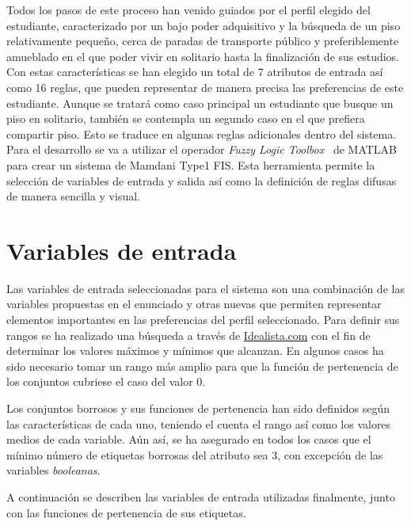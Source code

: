 \documentclass[12pt]{report} %
\begin{document}
        Todos los pasos de este proceso han venido guiados por el perfil
        elegido del estudiante, caracterizado por un bajo poder adquisitivo y
        la búsqueda de un piso relativamente pequeño, cerca de paradas de
        transporte público y preferiblemente amueblado en el que poder vivir en
        solitario hasta la finalización de sus estudios. Con estas
        características se han elegido un total de 7 atributos de entrada así
        como 16 reglas, que pueden representar de manera precisa las
        preferencias de este estudiante. Aunque se tratará como caso principal
        un estudiante que busque un piso en solitario, también se contempla un
        segundo caso en el que prefiera compartir piso. Esto se traduce en
        algunas reglas adicionales dentro del sistema. Para el desarrollo se va
        a utilizar el operador \textit{Fuzzy Logic Toolbox}~\cite{fuzzy-docs}
        de MATLAB para crear un sistema de Mamdani Type1 FIS. Esta herramienta
        permite la selección de variables de entrada y salida así como la
        definición de reglas difusas de manera sencilla y visual.

    \section{Variables de entrada}

        Las variables de entrada seleccionadas para el sistema son una
        combinación de las variables propuestas en el enunciado y otras nuevas
        que permiten representar elementos importantes en las preferencias del
        perfil seleccionado. Para definir sus rangos se ha realizado una
        búsqueda a través de \href{https://www.idealista.com/}{Idealista.com}
        con el fin de determinar los valores máximos y mínimos que alcanzan. En
        algunos casos ha sido necesario tomar un rango más amplio para que la
        función de pertenencia de los conjuntos cubriese el caso del valor 0.

        Los conjuntos borrosos y sus funciones de pertenencia han sido
        definidos según las características de cada uno, teniendo el cuenta el
        rango así como los valores medios de cada variable. Aún así, se ha
        asegurado en todos los casos que el mínimo número de etiquetas borrosas del
        atributo sea 3, con excepción de las variables \textit{booleanas}.

        A continuación se describen las variables de entrada utilizadas finalmente, junto con las funciones de pertenencia de sus etiquetas. 
\end{document}
